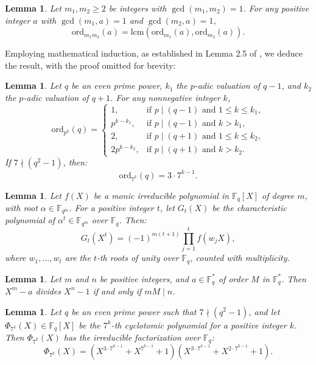 \documentclass[10pt,reqno]{amsart}
\newtheorem{lem}[thm]{Lemma}
\theoremstyle{definition}
\theoremstyle{remark}
\numberwithin{equation}{section}
\newcommand{\lcm}{\mbox{lcm}}
\begin{document}
\begin{lem}\label{lem2.4}
{\cite[Lemma 2.4]{[C25]}} Let $m_1, m_2 \geq 2$ be integers with $\gcd(m_1, m_2) = 1$. For any positive integer $a$ with $\gcd(m_1, a) = 1$ and $\gcd(m_2, a) = 1$,
$$\text{ord}_{m_1 m_2}(a) = \lcm(\text{ord}_{m_1}(a), \text{ord}_{m_2}(a)).$$
\end{lem}

Employing mathematical induction, as established in Lemma 2.5 of \cite{[C25]}, we deduce the result, with the proof omitted for brevity:
\begin{lem}\label{lem2.5}
 Let $q$ be an even prime power, $k_1$ the $p$-adic valuation of $q - 1$, and $k_2$ the $p$-adic valuation of $q + 1$. For any nonnegative integer $k$,
\[
\text{ord}_{p^k}(q) = \begin{cases} 
1, & \text{if } p \mid (q - 1) \text{ and } 1 \leq k \leq k_1, \\
p^{k - k_1}, & \text{if } p \mid (q - 1) \text{ and } k > k_1, \\
2, & \text{if } p \mid (q + 1) \text{ and } 1 \leq k \leq k_2, \\
2 p^{k - k_2}, & \text{if } p \mid (q + 1) \text{ and } k > k_2.
\end{cases}
\]
If $7 \nmid (q^2 - 1)$, then:
\[
\text{ord}_{7^k}(q) = 3 \cdot 7^{k-1}.
\]
\end{lem}

\begin{lem}\label{lem2.6}
{\cite[Theorem 3.39]{[LN97]}} Let $f(X)$ be a monic irreducible polynomial in $\mathbb{F}_q[X]$ of degree $m$, with root $\alpha \in \mathbb{F}_{q^m}$. For a positive integer $t$, let $G_t(X)$ be the characteristic polynomial of $\alpha^t \in \mathbb{F}_{q^m}$ over $\mathbb{F}_q$. Then:
\[
G_t(X^t) = (-1)^{m(t+1)} \prod_{j=1}^t f(w_j X),
\]
where $w_1, \ldots, w_t$ are the $t$-th roots of unity over $\mathbb{F}_q$, counted with multiplicity.
\end{lem}

\begin{lem}\label{lem2.7}
{\cite[Lemma 2]{[BMOV15]}} Let $m$ and $n$ be positive integers, and $a \in \mathbb{F}_q^*$ of order $M$ in $\mathbb{F}_q^*$. Then $X^m - a$ divides $X^n - 1$ if and only if $m M \mid n$.
\end{lem}

\begin{lem}\label{lem2.8}
Let $q$ be an even prime power such that $7 \nmid (q^2 - 1)$, and let $\Phi_{7^k}(X) \in \mathbb{F}_q[X]$ be the $7^k$-th cyclotomic polynomial for a positive integer $k$. Then $\Phi_{7^k}(X)$ has the irreducible factorization over $\mathbb{F}_q$:
\[
\Phi_{7^k}(X) = (X^{3 \cdot 7^{k-1}} + X^{7^{k-1}} + 1)(X^{3 \cdot 7^{k-1}} + X^{2 \cdot 7^{k-1}} + 1).
\]
\end{lem}
\end{document}
